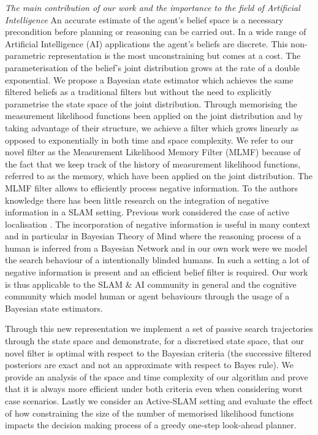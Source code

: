 \documentclass[review]{elsarticle}
\numberwithin{equation}{section}
\begin{document}
\textit{The main contribution of our work and the importance to the field of Artificial Intelligence} 
An accurate estimate of the agent's belief space is a necessary precondition before planning or reasoning can be carried out.
In a wide range of Artificial Intelligence (AI) applications the agent's beliefs are discrete. This non-parametric representation
is the most unconstraining but comes at a cost. The parameterisation of the belief's joint distribution grows at the rate of a double exponential.
We propose a Bayesian state estimator which achieves the same filtered beliefs as a traditional filters but without the need to explicitly parametrise the state space 
of the joint distribution. Through memorising the measurement likelihood functions been applied on the joint distribution 
and by taking advantage of their structure, we achieve a filter which grows linearly as opposed to exponentially 
in both time and space complexity. We refer to our novel filter as the Measurement Likelihood Memory Filter (MLMF) because
of the fact that we keep track of the history of measurement likelihood functions, referred to as the memory, which 
have been applied on the joint distribution.
The MLMF filter allows to efficiently process negative information. To the authors knowledge there has been little
research on the integration of negative information in a SLAM setting. Previous work considered the case of active localisation \cite{NegInfoFurtherStudies}.
The incorporation of negative information is useful in many context and in particular in Bayesian Theory of Mind \cite{Bake_Saxe_Tene_2011}
where the reasoning process of a human is inferred from a Bayesian Network and in our own work \cite{deChambrier2013} were we model the search behaviour of a intentionally blinded
humans. In such a setting a lot of negative information is present and an efficient belief filter is required. Our work is thus applicable to the SLAM \& AI community in general
and the cognitive community which model human or agent behaviours through the usage of a Bayesian state estimators.


Through this new representation we implement a set of passive search trajectories through the state 
space and demonstrate, for a discretised state space, that our novel filter is optimal with respect to the Bayesian criteria (the successive
filtered posteriors are exact and not an approximate with respect to Bayes rule). We provide an analysis of the space and time complexity of 
our algorithm and prove that it is always more efficient under both criteria even when considering worst case scenarios.
Lastly we consider an Active-SLAM setting and evaluate the effect of how constraining the size of the number of memorised likelihood 
functions impacts the decision making process of a greedy one-step look-ahead planner.
\end{document}
